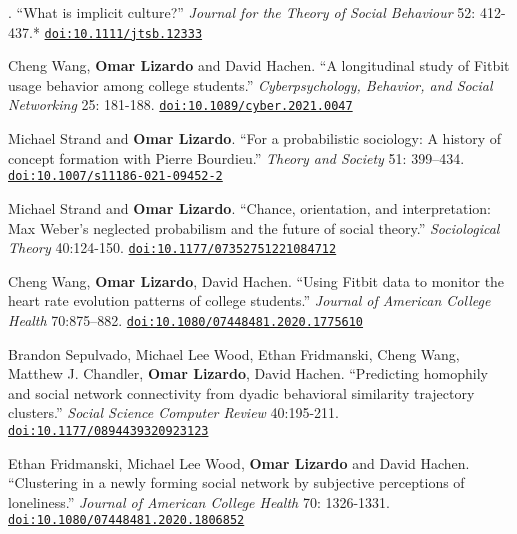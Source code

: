 
. ``What is implicit culture?''  {\em Journal for the Theory of Social Behaviour} 52: 412-437.\textcolor{uclablue}{*} \href{https://doi.org/10.1111/jtsb.12333}{\nolinkurl{doi:10.1111/jtsb.12333}}

\ind Cheng Wang, {\bf Omar Lizardo} and David Hachen. ``A longitudinal study of Fitbit usage behavior among college students.'' {\em Cyberpsychology, Behavior, and Social Networking} 25: 181-188. \href{https://doi.org/10.1089/cyber.2021.0047}{\nolinkurl{doi:10.1089/cyber.2021.0047}}

\ind Michael Strand and {\bf Omar Lizardo}. ``For a probabilistic sociology: A history of concept formation with Pierre Bourdieu.'' {\em Theory and Society} 51: 399–434.  \href{https://doi.org/10.1007/s11186-021-09452-2}{\nolinkurl{doi:10.1007/s11186-021-09452-2}} 

\ind Michael Strand and {\bf Omar Lizardo}. ``Chance, orientation, and interpretation:  Max Weber’s neglected probabilism and the future of social theory.'' {\em Sociological Theory} 40:124-150. \href{https://doi.org/10.1177/07352751221084712}{\nolinkurl{doi:10.1177/07352751221084712}}

\ind Cheng Wang, {\bf Omar Lizardo}, David Hachen. ``Using Fitbit data to monitor the heart rate evolution patterns of college students.'' {\em Journal of American College Health} 70:875–882. \href{https://doi.org/10.1080/07448481.2020.1775610}{\nolinkurl{doi:10.1080/07448481.2020.1775610}}

\ind Brandon Sepulvado, Michael Lee Wood, Ethan Fridmanski, Cheng Wang, Matthew J. Chandler, {\bf Omar Lizardo}, David Hachen. ``Predicting homophily and social network connectivity from dyadic behavioral similarity trajectory clusters.'' {\em Social Science Computer Review} 40:195-211. \href{https://doi.org/10.1177/0894439320923123}{\nolinkurl{doi:10.1177/0894439320923123}}

\ind \ind Ethan Fridmanski, Michael Lee Wood, {\bf Omar Lizardo} and David Hachen. ``Clustering in a newly forming social network by subjective perceptions of loneliness.''  {\em Journal of American College Health} 70: 1326-1331. \href{https://doi.org/10.1080/07448481.2020.1806852}{\nolinkurl{doi:10.1080/07448481.2020.1806852}}
